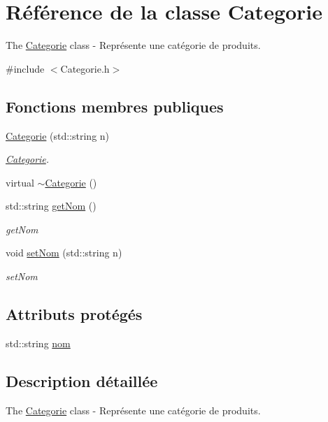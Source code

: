 \hypertarget{class_categorie}{\section{Référence de la classe Categorie}
\label{class_categorie}
}


The \hyperlink{class_categorie}{Categorie} class -\/ Représente une catégorie de produits.  




{\ttfamily \#include $<$Categorie.\-h$>$}

\subsection*{Fonctions membres publiques}
\begin{DoxyCompactItemize}
\item 
\hyperlink{class_categorie_ab7ef54581c3480eaa164f694eb934363}{Categorie} (std\-::string n)
\begin{DoxyCompactList}\small\item\em \hyperlink{class_categorie}{Categorie}. \end{DoxyCompactList}\item 
virtual \hyperlink{class_categorie_a7dd277a29ddea8656e9baf073d8a2a55}{$\sim$\-Categorie} ()
\item 
std\-::string \hyperlink{class_categorie_af6bde3e082e8bf1991616ef7021326d7}{get\-Nom} ()
\begin{DoxyCompactList}\small\item\em get\-Nom \end{DoxyCompactList}\item 
void \hyperlink{class_categorie_ad73a8841ac056863263d544c48ba7e29}{set\-Nom} (std\-::string n)
\begin{DoxyCompactList}\small\item\em set\-Nom \end{DoxyCompactList}\end{DoxyCompactItemize}
\subsection*{Attributs protégés}
\begin{DoxyCompactItemize}
\item 
std\-::string \hyperlink{class_categorie_ab2d6a5bf4d0f404966e4495ee7e47c2d}{nom}
\end{DoxyCompactItemize}


\subsection{Description détaillée}
The \hyperlink{class_categorie}{Categorie} class -\/ Représente une catégorie de produits. 

